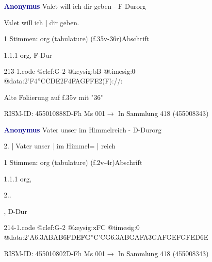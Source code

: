 \documentclass[twocolumn]{book}
\begin{document}
\par \vspace{7pt} \textcolor{darkblue}{\textbf{Anonymus  }}\hfillplus{\textbf{[213]}}\newline Valet will ich dir geben - F-Dur\newline org
\par \begin{itshape}[f.35v, at left:] Valet will ich | dir geben.\end{itshape} 
\par \textcolor{darkblue}{}  1 Stimmen: org (tabulature)  (f.35v-36r)\newline Abschrift
\par 1.1.1  org, F-Dur  
\begin{filecontents*}{213-1.code}
@clef:G-2
@keysig:bB
@timesig:0
@data:2'F4''CCDE2F4FAGFFE2(F)://:
\end{filecontents*}
\newline
%
\par Alte Foliierung auf f.35v mit "36"
\par RISM-ID: 455010888\newline D-Fh  Ms 001\newline $\rightarrow$ In Sammlung 418 (455008343)
      
\par \vspace{7pt} \textcolor{darkblue}{\textbf{Anonymus  }}\hfillplus{\textbf{[214]}}\newline Vater unser im Himmelreich - D-Dur\newline org
\par \begin{itshape}[f.2v, at left:] 2. | Vater unser | im Himmel= | reich\end{itshape} 
\par \textcolor{darkblue}{}  1 Stimmen: org (tabulature)  (f.2v-4r)\newline Abschrift
\par 1.1.1  org, \begin{itshape}2..\end{itshape}, D-Dur  
\begin{filecontents*}{214-1.code}
@clef:G-2
@keysig:xFC
@timesig:0
@data:2'A{6.3ABAB}{6FDEF}{G''C'CG}{6.3ABGA}{FA}{3GAFG}{EFGF}{ED6E}
\end{filecontents*}
\newline
%
\par RISM-ID: 455010802\newline D-Fh  Ms 001\newline $\rightarrow$ In Sammlung 418 (455008343)
      
\end{document}
